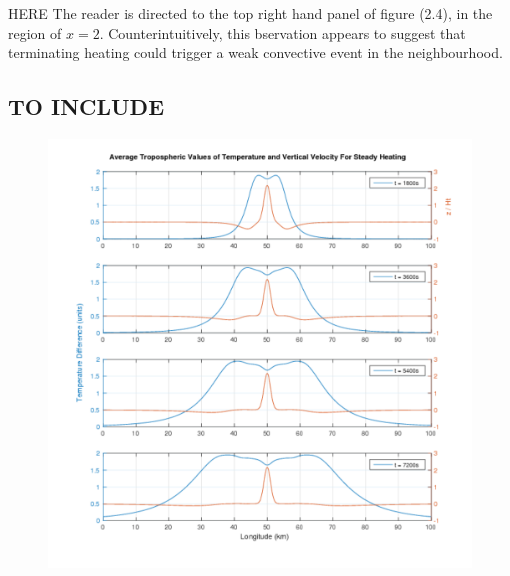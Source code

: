 \documentclass[a4paper,10pt]{article}
\begin{document}


HERE The reader is directed to the top right hand panel of
figure (2.4), in the region of $x = 2$. Counterintuitively, this bservation appears to suggest that
terminating heating could trigger a weak convective event in the neighbourhood.


\subsection{TO INCLUDE}
\begin{figure}[h!]
  \caption{}
  \centering
    \includegraphics[width=1\textwidth]{trop_values_steady.pdf}
  \label{trop_values_steady}
\end{figure}
\end{document}
